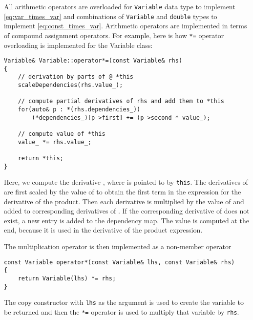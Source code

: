 \documentclass[10pt]{ijnam}
\theoremstyle{definition}
\begin{document}
All arithmetic operators are overloaded for \verb|Variable| data type to implement 
\eqref{eq:var_times_var} and combinations of \verb|Variable| and \verb|double| 
types to implement \eqref{eq:const_times_var}.
Arithmetic operators are implemented in terms of compound assignment operators. For 
example, here is how \texttt{*=} operator overloading is implemented for the Variable class:
\begin{lstlisting}
Variable& Variable::operator*=(const Variable& rhs)
{
    // derivation by parts of @ *this
    scaleDependencies(rhs.value_);

    // compute partial derivatives of rhs and add them to *this
    for(auto& p : *(rhs.dependencies_))
        (*dependencies_)[p->first] += (p->second * value_);

    // compute value of *this
    value_ *= rhs.value_;

    return *this;
}
\end{lstlisting}
Here, we compute the derivative , where  is pointed to by \texttt{this}. The derivatives of  are first scaled by the value
of  to obtain the first term in the expression for the derivative of the product. 
Then each  derivative is multiplied by the value of  and added to corresponding
derivatives of . If the corresponding derivative of  does not exist,
a new entry is added to the dependency map.
The value is computed at the end, because it is used in the
derivative of the product expression.

The multiplication operator is then implemented as a non-member operator
\begin{lstlisting}
const Variable operator*(const Variable& lhs, const Variable& rhs)
{
    return Variable(lhs) *= rhs;
}
\end{lstlisting}
The copy constructor with \texttt{lhs} as the argument is used to create the variable to be 
returned and then the \texttt{*=} operator is used to multiply that variable by \texttt{rhs}.
\end{document}
